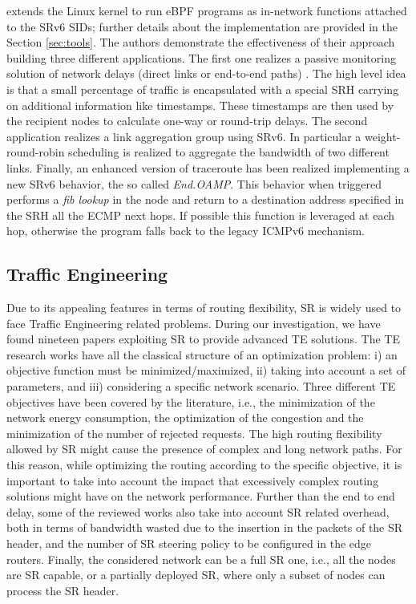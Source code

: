 \cite{xhonneux2018leveraging} extends the Linux kernel to run eBPF programs as in-network functions attached to the SRv6 SIDs; further details about the implementation are provided in the Section \ref{sec:tools}. The authors demonstrate the effectiveness of their approach building three different applications. The first one realizes a passive monitoring solution of network delays (direct links or end-to-end paths) \cite{id-udp-pm}. The high level idea is that a small percentage of traffic is encapsulated with a special SRH carrying on additional information like timestamps. These timestamps are then used by the recipient nodes to calculate one-way or round-trip delays. 
The second application realizes a link aggregation group using SRv6. In particular a weight-round-robin scheduling is realized to aggregate the bandwidth of two different links. Finally, an enhanced version of traceroute has been realized implementing a new SRv6 behavior, the so called \textit{End.OAMP}. This behavior when triggered performs a \textit{fib lookup} in the node and return to a destination address specified in the SRH all the ECMP next hops. If possible this function is leveraged at each hop, otherwise the program falls back to the legacy ICMPv6 mechanism.

\subsection{Traffic Engineering}
\label{sec:te}
Due to its appealing features in terms of routing flexibility, SR is widely used to face Traffic Engineering related problems.
During our investigation, we have found nineteen papers exploiting SR to provide advanced TE solutions.
The TE research works have all the classical structure of an optimization problem: i) an objective function must be minimized/maximized, ii) taking into account a set of parameters, and iii) considering a specific network scenario.
Three different TE objectives have been covered by the literature, i.e., the minimization of the network energy consumption, the optimization of the congestion and the minimization of the number of rejected requests.
The high routing flexibility allowed by SR might cause the presence of complex and long network paths.
For this reason, while optimizing the routing according to the specific objective, it is important to take into account the impact that excessively complex routing solutions might have on the network performance.
Further than the end to end delay, some of the reviewed works also take into account SR related overhead, both in terms of bandwidth wasted due to the insertion in the packets of the SR header, and the number of SR steering policy to be configured in the edge routers.
Finally, the considered network can be a full SR one, i.e., all the nodes are SR capable, or a partially deployed SR, where only a subset of nodes can process the SR header.

